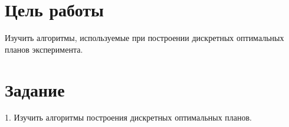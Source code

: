 ﻿%

\newcommand{\insertImage}[1]
{
	\begin{figure}[!htb] %
		\centering
		\texttt{[image: \#1]}
	\end{figure}
}

\newcommand{\insertTwoImages}[2]
{
	\begin{figure}[!htb] %
		\centering
		\texttt{[image: \#1]}
		\texttt{[image: \#2]}
	\end{figure}
}

\newcommand{\insertFourImages}[5]
{
	\begin{figure}[!htb] %
		\centering
		\texttt{[image: ../pics/plan\_Fedorov\_30\_\#1\_0.01\_\#2.png]}
		\texttt{[image: ../pics/plan\_Fedorov\_30\_\#1\_0.01\_\#3.png]}
		\texttt{[image: ../pics/plan\_Fedorov\_30\_\#1\_0.01\_\#4.png]}
		\texttt{[image: ../pics/plan\_Fedorov\_30\_\#1\_0.01\_\#5.png]}
	\end{figure}
}




\section{Цель работы}
Изучить алгоритмы, используемые при построении дискретных оптимальных планов эксперимента.


\section{Задание}

1.	Изучить алгоритмы построения дискретных оптимальных планов. 

